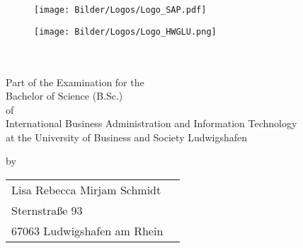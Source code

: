 \thispagestyle{empty}
\begin{titlepage}
\enlargethispage{4cm}

\begin{figure}           %
	\vspace*{-5mm} %
	\begin{minipage}{0.49\textwidth}
		\flushleft
		\texttt{[image: Bilder/Logos/Logo\_SAP.pdf]} 
	\end{minipage}
	\hfill
	\begin{minipage}{0.49\textwidth}
	
		\texttt{[image: Bilder/Logos/Logo\_HWGLU.png]} 
	\end{minipage}
	\hfill
\end{figure} 
\vspace*{0.1cm}

\begin{center}
	\huge{\textbf{\titel}}\\[1.5cm]
	\Large{\textbf{\arbeit}}\\[1cm]
	\normalsize{Part of the Examination for the \\[0.2cm]Bachelor of Science (B.Sc.)\\[0.2cm] of \\[0.2cm]}
	\normalsize{International Business Administration and Information Technology}\\[0.2cm]
	\normalsize{at the University of Business and Society Ludwigshafen}\\[2cm]
	
\end{center}

\begin{center}
	\vfill
	\normalsize{by}\\[0.5cm]
	\begin{tabular}{ll}
		Lisa Rebecca Mirjam Schmidt                   \\[0.2cm]
		Sternstraße 93  \\[0.2cm]
		67063 Ludwigshafen am Rhein\\[2cm]
	\end{tabular} 
\end{center}


\end{titlepage}

